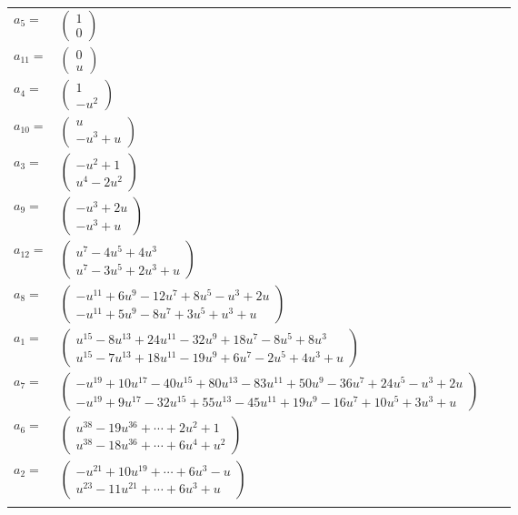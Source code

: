 \documentclass[1p]{elsarticle_modified}
\theoremstyle{definition}
\begin{document}
\begin{tabular}{m{7pt} m{180pt} m{7pt} m{180pt} }
\flushright $a_{5}=$&$\begin{pmatrix}1\\0\end{pmatrix}$ \\
\flushright $a_{11}=$&$\begin{pmatrix}0\\u\end{pmatrix}$ \\
\flushright $a_{4}=$&$\begin{pmatrix}1\\- u^2\end{pmatrix}$ \\
\flushright $a_{10}=$&$\begin{pmatrix}u\\- u^3+u\end{pmatrix}$ \\
\flushright $a_{3}=$&$\begin{pmatrix}- u^2+1\\u^4-2 u^2\end{pmatrix}$ \\
\flushright $a_{9}=$&$\begin{pmatrix}- u^3+2 u\\- u^3+u\end{pmatrix}$ \\
\flushright $a_{12}=$&$\begin{pmatrix}u^7-4 u^5+4 u^3\\u^7-3 u^5+2 u^3+u\end{pmatrix}$ \\
\flushright $a_{8}=$&$\begin{pmatrix}- u^{11}+6 u^9-12 u^7+8 u^5- u^3+2 u\\- u^{11}+5 u^9-8 u^7+3 u^5+u^3+u\end{pmatrix}$ \\
\flushright $a_{1}=$&$\begin{pmatrix}u^{15}-8 u^{13}+24 u^{11}-32 u^9+18 u^7-8 u^5+8 u^3\\u^{15}-7 u^{13}+18 u^{11}-19 u^9+6 u^7-2 u^5+4 u^3+u\end{pmatrix}$ \\
\flushright $a_{7}=$&$\begin{pmatrix}- u^{19}+10 u^{17}-40 u^{15}+80 u^{13}-83 u^{11}+50 u^9-36 u^7+24 u^5- u^3+2 u\\- u^{19}+9 u^{17}-32 u^{15}+55 u^{13}-45 u^{11}+19 u^9-16 u^7+10 u^5+3 u^3+u\end{pmatrix}$ \\
\flushright $a_{6}=$&$\begin{pmatrix}u^{38}-19 u^{36}+\cdots+2 u^2+1\\u^{38}-18 u^{36}+\cdots+6 u^4+u^2\end{pmatrix}$ \\
\flushright $a_{2}=$&$\begin{pmatrix}- u^{21}+10 u^{19}+\cdots+6 u^3- u\\u^{23}-11 u^{21}+\cdots+6 u^3+u\end{pmatrix}$\\&\end{tabular}
\end{document}
